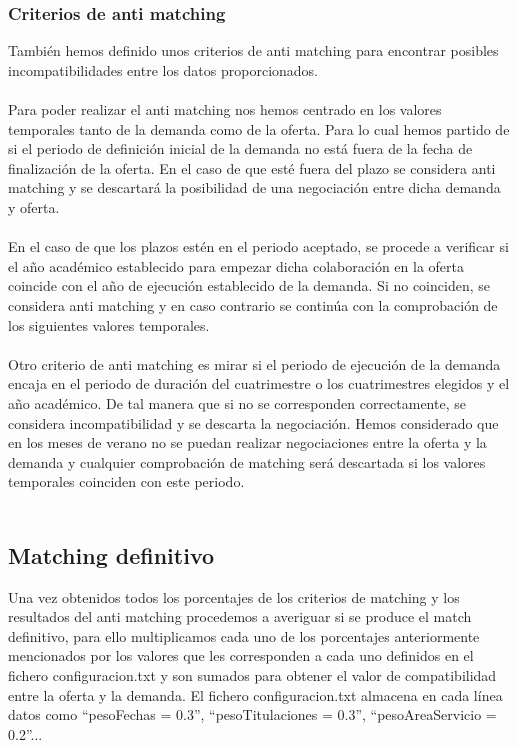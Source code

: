 \documentclass[11pt]{article}
\begin{document}
\subsubsection{Criterios de anti matching }

También hemos definido unos criterios de anti matching para encontrar posibles incompatibilidades entre los datos proporcionados.\\\\
Para poder realizar el anti matching nos hemos centrado en los valores temporales tanto de la demanda como de la oferta. Para lo cual hemos partido de si el periodo de definición inicial de la demanda no está fuera de la fecha de finalización de la oferta. En el caso de que esté fuera del plazo se considera anti matching y se descartará la posibilidad de una negociación entre dicha demanda y oferta. \\\\

En el caso de que los plazos estén en el periodo aceptado, se procede a verificar si el año académico establecido para empezar dicha colaboración en la oferta coincide con el año de ejecución establecido de la demanda. Si no coinciden, se considera anti matching y en caso contrario se continúa con la comprobación de los siguientes valores temporales.\\\\

Otro criterio de anti matching es mirar si el periodo de ejecución de la demanda encaja en el periodo de duración del cuatrimestre o los cuatrimestres elegidos y el año académico. De tal manera que si no se corresponden correctamente, se considera incompatibilidad y se descarta la negociación. Hemos considerado que en los meses de verano no se puedan realizar negociaciones entre la oferta y la demanda y cualquier comprobación de matching será descartada si los valores temporales coinciden con este periodo.\\\\


\subsection{Matching definitivo}

Una vez obtenidos todos los porcentajes de los criterios de matching y los resultados del anti matching procedemos a averiguar si se produce el match definitivo, para ello multiplicamos cada uno de los porcentajes anteriormente mencionados por los valores que les corresponden a cada uno definidos en el fichero configuracion.txt y son sumados para obtener el valor de compatibilidad entre la oferta y la demanda. El fichero configuracion.txt almacena en cada línea datos como “pesoFechas = 0.3”, “pesoTitulaciones = 0.3”, “pesoAreaServicio = 0.2”...  \\\\
\end{document}
